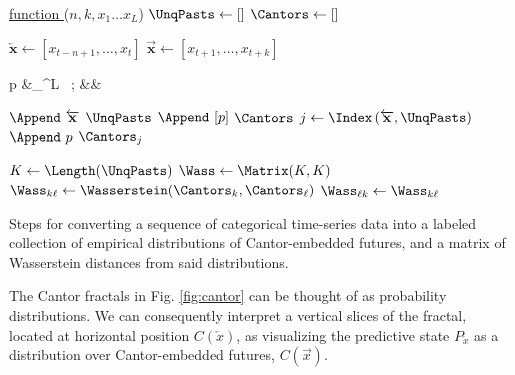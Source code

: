 \documentclass[sigconf, anonymous, review]{acmart}
\begin{document}
\begin{algorithm}[t]
   
  
  \underline{function \CantorWasserstein} ($n,k,x_1\dots x_L$)\;
  $\UnqPasts \leftarrow \left[\right]$\; 
  $\Cantors \leftarrow \left[\right]$\; 
   { 
    $\overleftarrow{\mathbf{x}} \leftarrow \left[x_{t-n+1},\dots, x_{t}\right]$\;
    $\overrightarrow{\mathbf{x}} \leftarrow \left[x_{t+1},\dots, x_{t+k}\right]$\;
      \vspace{-1.5em}
      \begin{flalign*}
        p &\leftarrow \sum_{}^L
        \ ; &&
      \end{flalign*}

       { 
        $\Append\ \overleftarrow{\mathbf{x}}$ \KwTo $\UnqPasts$\; 
        $\Append\ [p]$ \KwTo $\Cantors$\; 
        } { 
        $j \leftarrow \Index\left(\overleftarrow{\mathbf{x}},\UnqPasts\right)$\;
        $\Append\ p$ \KwTo $\Cantors_j$\; 
        } 
  }
  $K \leftarrow \Length(\UnqPasts)$\; 
  $\Wass \leftarrow \Matrix(K,K)$\;
   { 
     {  
      $\Wass_{k \ell}
        \leftarrow
        \Wasserstein(\Cantors_k,\Cantors_\ell)$\;
        $\Wass_{\ell k} \leftarrow \Wass_{k \ell}$\; } } 
  \KwResult{$\UnqPasts$,$\Cantors$,$\Wass$}
  \caption{Steps for converting a sequence of categorical time-series data
        into a labeled collection of empirical distributions of Cantor-embedded futures,
        and a matrix of Wasserstein distances from said distributions.}
  \label{alg:cantorwass}
\end{algorithm}

The Cantor fractals in Fig. \ref{fig:cantor} can be thought of as probability
distributions. We can consequently interpret a vertical slices of the fractal,
located at horizontal position $C(\overleftarrow{x})$, as visualizing the
predictive state $P_{\overleftarrow{x}}$ as a distribution over Cantor-embedded
futures, $C(\overrightarrow{x})$.
\end{document}
